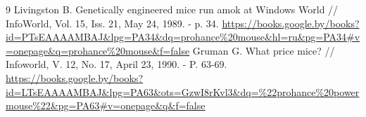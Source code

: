 \documentclass[11pt, a4paper]{article}
\begin{document}
\begin{thebibliography}{9}
 Livingston B. Genetically engineered mice run amok at Windows World // InfoWorld, Vol. 15, Iss. 21, May 24, 1989. - p. 34. \url{https://books.google.by/books?id=PTsEAAAAMBAJ&lpg=PA34&dq=prohance%20mouse&hl=ru&pg=PA34#v=onepage&q=prohance%20mouse&f=false}
 Gruman G. What price mice? // Infoworld, V. 12, No. 17, April 23, 1990. - P. 63-69. \url{https://books.google.by/books?id=LTsEAAAAMBAJ&lpg=PA63&ots=GzwI8rKvl3&dq=%22prohance%20powermouse%22&pg=PA63#v=onepage&q&f=false}
\end{thebibliography}
\end{document}
